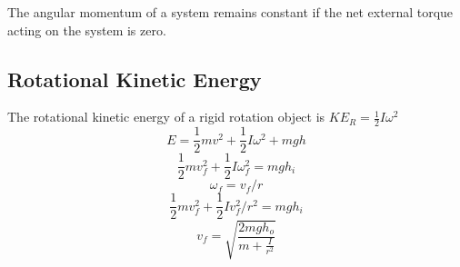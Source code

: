 The angular momentum of a system remains constant if the net external torque acting on the system is zero. 














\subsection{Rotational Kinetic Energy}
The rotational kinetic energy of a rigid rotation object is $KE_R=\frac{1}{2}I\omega^2$
\[E=\frac{1}{2}mv^2+\frac{1}{2}I\omega^2+mgh\]
\[\frac{1}{2}mv_f^2+\frac{1}{2}I\omega^2_f=mgh_i\]
\[\omega _f=v_f/r\]
\[\frac{1}{2}mv^2_f+\frac{1}{2}Iv^2_f/r^2=mgh_i\]
\[v_f=\sqrt{\frac{2mgh_o}{m+\frac{I}{r^2}}}\]